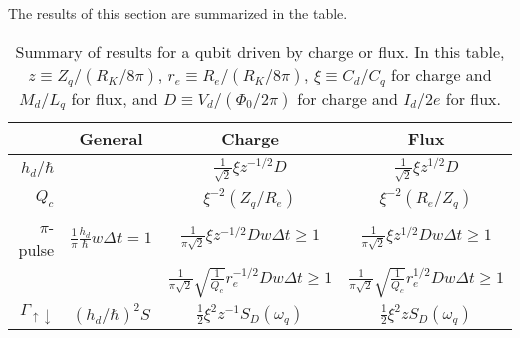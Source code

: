 
The results of this section are summarized in the table.
\begin{table*}
  \centering
  \begin{tabular}{|r|c|c|c|}
    \hline
    & General & Charge & Flux \\
    \hline \hline
    $h_d/\hbar$
      &
      & $\frac{1}{\sqrt{2}} \xi z^{-1/2} D$
      & $\frac{1}{\sqrt{2}} \xi z^{1/2} D$
      \\
    \hline
    $Q_c$
      &
      & $\xi^{-2} (Z_q/R_e)$
      & $\xi^{-2} (R_e/Z_q)$
      \\
    \hline
    $\pi$-pulse
      & $\frac{1}{\pi} \frac{h_d}{\hbar} w \Delta t = 1$
      & $\frac{1}{\pi\sqrt{2}} \xi z^{-1/2} D w \Delta t \geq 1$
      & $\frac{1}{\pi\sqrt{2}} \xi z^{1/2}  D w \Delta t \geq 1$
      \\
      &
      & $\frac{1}{\pi\sqrt{2}} \sqrt{\frac{1}{Q_c}} r_e^{-1/2} D w \Delta t \geq 1$
      & $\frac{1}{\pi\sqrt{2}} \sqrt{\frac{1}{Q_c}} r_e^{1/2}  D w \Delta t \geq 1$
      \\
    \hline
    $\Gamma_{\uparrow\downarrow}$
      & $(h_d/\hbar)^2 S$
      & $\frac{1}{2} \xi^2 z^{-1} S_D(\omega_q)$
      & $\frac{1}{2} \xi^2 z      S_D(\omega_q)$
      \\
    \hline
  \end{tabular}
  \caption{Summary of results for a qubit driven by charge or flux. In this table, $z\equiv Z_q/(R_K/8\pi)$, $r_e \equiv R_e / (R_K/8\pi)$, $\xi \equiv C_d/C_q$ for charge and $M_d/L_q$ for flux, and $D \equiv V_d/(\Phi_0 / 2\pi)$ for charge and $I_d/2e$ for flux.}
\end{table*}
